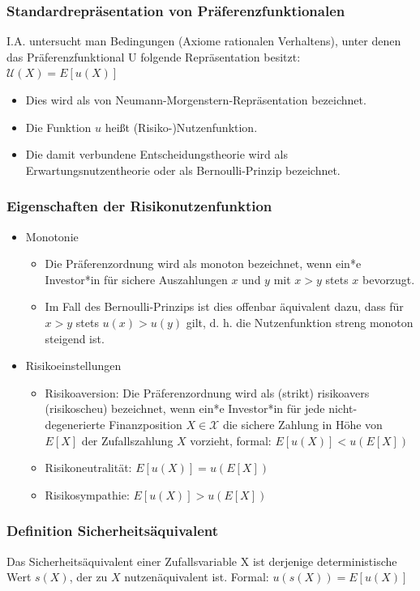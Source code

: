 \documentclass[12pt]{report}
\theoremstyle{dotless}
\theoremstyle{definition}
\begin{document}
\subsubsection{Standardrepräsentation von Präferenzfunktionalen}
I.A. untersucht man Bedingungen (Axiome rationalen Verhaltens),
unter denen das Präferenzfunktional U folgende Repräsentation besitzt: $\mathcal{U}(X) = E[u(X)]$

\begin{itemize}
\item Dies wird als von Neumann-Morgenstern-Repräsentation bezeichnet.
\item Die Funktion $u$ heißt (Risiko-)Nutzenfunktion.
\item Die damit verbundene Entscheidungstheorie wird als Erwartungsnutzentheorie
oder als Bernoulli-Prinzip bezeichnet.
\end{itemize}

\subsubsection{Eigenschaften der Risikonutzenfunktion}

\begin{itemize}
\item Monotonie
\begin{itemize}
\item Die Präferenzordnung wird als monoton bezeichnet, wenn ein*e Investor*in für
sichere Auszahlungen $x$ und $y$ mit $x > y$ stets $x$ bevorzugt.
\item Im Fall des Bernoulli-Prinzips ist dies offenbar äquivalent dazu, dass für $x > y$
stets $u(x) > u(y)$ gilt, d. h. die Nutzenfunktion streng monoton steigend ist.
\end{itemize}
\item Risikoeinstellungen
\begin{itemize}
\item Risikoaversion: Die Präferenzordnung wird als (strikt) risikoavers (risikoscheu) bezeichnet, wenn ein*e Investor*in für jede nicht-degenerierte Finanzposition $X \in \mathcal{X}$ die sichere Zahlung in Höhe von $E[X]$
der Zufallszahlung $X$ vorzieht, formal: $E[u(X)]<u(E[X])$
\item Risikoneutralität: $E[u(X)] = u(E[X])$
\item Risikosympathie: $E[u(X)] > u(E[X])$
\end{itemize}
\end{itemize}

\subsubsection{Definition Sicherheitsäquivalent}
Das Sicherheitsäquivalent einer Zufallsvariable X ist derjenige deterministische
Wert $s(X)$, der zu $X$ nutzenäquivalent ist. Formal: $ u(s(X)) = E[u(X)]$ \\
\end{document}
